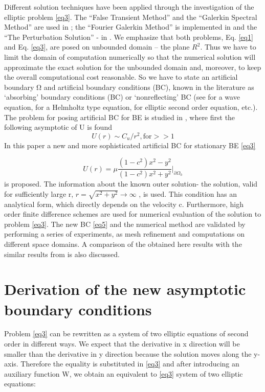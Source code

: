 \documentclass[12pt]{article}
\newcommand{\dO}{\partial\Omega_{h}}
\theoremstyle{theorem}
\theoremstyle{defi}
\begin{document}
Different solution techniques have been applied through the investigation of the elliptic problem \ref{eq3}. The “False Transient Method” and the “Galerkin Spectral Method” are used in \cite{ref6,ref9} ; the “Fourier Galerkin Method” is implemented in \cite{ref8,ref9} and the “The Perturbation Solution” - in \cite{ref10}.
We emphasize that both problems, Eq. \ref{eq1} and Eq. \ref{eq3}, are posed on unbounded domain – the plane $R^2$. Thus we have to limit the domain of computation numerically so that the numerical solution will approximate the exact solution for the unbounded domain and, moreover, to keep the overall computational cost reasonable.
So we have to state an artificial boundary $Ω$ and artificial boundary conditions (BC), known in the literature as ‘absorbing’ boundary conditions (BC) or ‘nonreflecting’ BC (see \cite{ref11} for a wave equation, \cite{ref12} for a Helmholtz type equation, \cite{ref13} for elliptic second order equation, etc.). 
\\
The problem for posing artificial BC for BE is studied in \cite{ref6}, where first the following asymptotic of U is found
\begin{equation}
U(r) \sim  C_u/r^2, \text{for} >> 1\label{eq4}
\end{equation}
In this paper a new and more sophisticated artificial BC for stationary BE \ref{eq3}

\begin{equation}
U(r) =  \mu \frac{(1-c^2)x^2 - y^2}{(1-c^2)x^2 + y^2}|_{\dO}  \label{eq5}
\end{equation}
is proposed. The information about the known outer solution- the solution, valid for sufficiently large r, $ r=\sqrt{x^2 + y^2}\rightarrow \infty$  , is used. This condition has an analytical form, which directly depends on the velocity c. Furthermore, high order finite difference schemes are used for numerical evaluation of the solution to problem \ref{eq3}. The new BC \ref{eq5} and the numerical method are validated by performing a series of experiments, as mesh refinement and computations on different space domains. A comparison of the obtained here results with the similar results from  \cite{ref10} is also discussed. 

\section{Derivation of the new asymptotic boundary conditions }

Problem \ref{eq3} can be rewritten as a system of two elliptic equations of second order in different ways. We expect that the derivative   in x direction will be smaller than the derivative   in y direction because the solution moves along the y-axis. Therefore the equality   is substituted in \ref{eq3} and after introducing an auxiliary function W, we obtain an equivalent to \ref{eq3} system of two elliptic equations:
\end{document}
